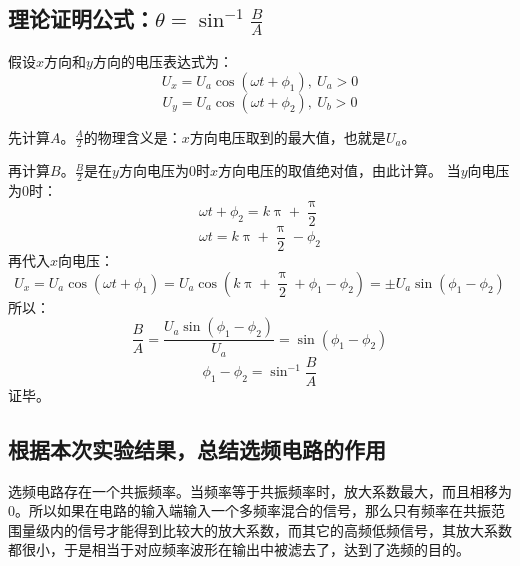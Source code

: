 \documentclass[a4paper,11pt,UTF8]{ctexart}
\begin{document}
\subsection{理论证明公式：$\theta=\sin^{-1}\frac{B}{A}$}
假设$x$方向和$y$方向的电压表达式为：
\[U_x=U_a\cos(\omega t+\phi_1),~U_a>0\]
\[U_y=U_a\cos(\omega t+\phi_2),~U_b>0\]
\par 先计算$A$。$\frac{A}{2}$的物理含义是：$x$方向电压取到的最大值，也就是$U_a$。
\par 再计算$B$。$\frac{B}{2}$是在$y$方向电压为0时$x$方向电压的取值绝对值，由此计算。
当$y$向电压为0时：
\[ \omega t+\phi_2 = k\uppi+\frac{\uppi}{2} \]
\[ \omega t = k\uppi+\frac{\uppi}{2}-\phi_2 \]
再代入$x$向电压：
\[ U_x=U_a\cos(\omega t+\phi_1)
=U_a\cos(k\uppi+\frac{\uppi}{2}+\phi_1-\phi_2)
=\pm U_a\sin(\phi_1-\phi_2) \]
所以：
\[ \frac{B}{A} = \frac{U_a\sin(\phi_1-\phi_2)}{U_a}=\sin(\phi_1-\phi_2) \]
\[ \phi_1-\phi_2 = \sin^{-1}\frac{B}{A} \]
证毕。
\subsection{根据本次实验结果，总结选频电路的作用}
选频电路存在一个共振频率。当频率等于共振频率时，放大系数最大，而且相移为0。所以如果在电路的输入端输入一个多频率混合的信号，那么只有频率在共振范围量级内的信号才能得到比较大的放大系数，而其它的高频低频信号，其放大系数都很小，于是相当于对应频率波形在输出中被滤去了，达到了选频的目的。
\end{document}

